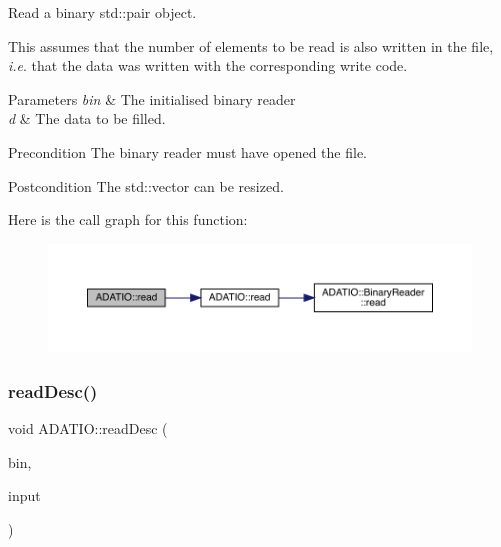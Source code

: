 Read a binary std\+::pair object. 

This assumes that the number of elements to be read is also written in the file, {\itshape i.\+e}. that the data was written with the corresponding write code. 
\begin{DoxyParams}{Parameters}
{\em bin} & The initialised binary reader \\
\hline
{\em d} & The data to be filled.\\
\hline
\end{DoxyParams}
\begin{DoxyPrecond}{Precondition}
The binary reader must have opened the file. 
\end{DoxyPrecond}
\begin{DoxyPostcond}{Postcondition}
The std\+::vector can be resized. 
\end{DoxyPostcond}
Here is the call graph for this function\+:\nopagebreak
\begin{figure}[H]
\begin{center}
\leavevmode
\includegraphics[width=350pt]{d0/dba/namespaceADATIO_a746a6511817f141011d50005a099feec_cgraph}
\end{center}
\end{figure}
\mbox{\label{namespaceADATIO_af57306a140489d28cd8fa1107d585906}} 
\subsubsection{\texorpdfstring{readDesc()}{readDesc()}}
{\footnotesize\ttfamily void A\+D\+A\+T\+I\+O\+::read\+Desc (\begin{DoxyParamCaption}\item[{\mbox{\hyperlink{classADATIO_1_1BinaryReader}{Binary\+Reader}} \&}]{bin,  }\item[{std\+::string \&}]{input }\end{DoxyParamCaption})}


